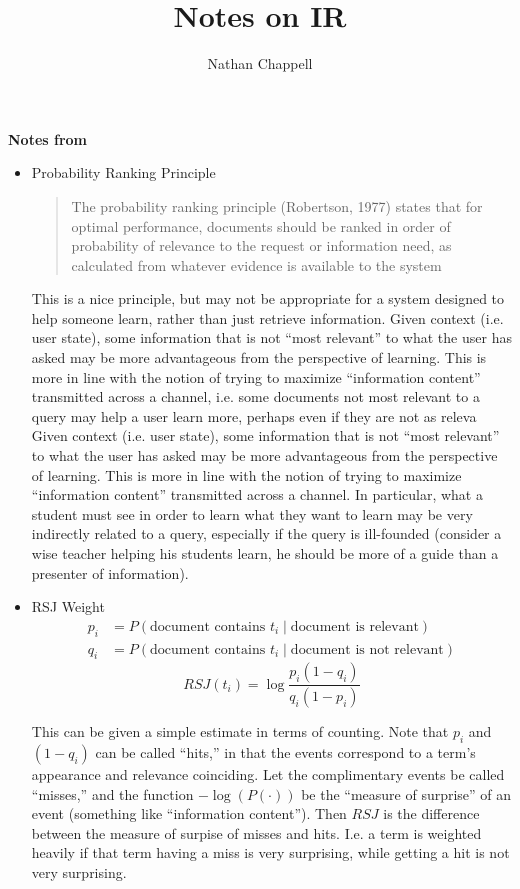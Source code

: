 \documentclass{article}
\title{Notes on IR}
\author{Nathan Chappell}
\newcommand{\hi}[1]{{\large {\bf #1}}}
\begin{document}
\maketitle

\hi{Notes from \cite{robertson04}}

\begin{itemize}
\item Probability Ranking Principle
    \begin{quote}
    The probability ranking principle (Robertson, 1977) states that for optimal performance, documents should be ranked in order of probability of relevance to the request or information need, as calculated from whatever evidence is available to the system
    \end{quote}

    This is a nice principle, but may not be appropriate for a system designed to help someone learn, rather than just retrieve information.  Given context (i.e. user state), some information that is not ``most relevant'' to what the user has asked may be more advantageous from the perspective of learning.  This is more in line with the notion of trying to maximize ``information content'' transmitted across a channel, i.e. some documents not most relevant to a query may help a user learn more, perhaps even if they are not as releva Given context (i.e. user state), some information that is not ``most relevant'' to what the user has asked may be more advantageous from the perspective of learning.  This is more in line with the notion of trying to maximize ``information content'' transmitted across a channel.  In particular, what a student must see in order to learn what they want to learn may be very indirectly related to a query, especially if the query is ill-founded (consider a wise teacher helping his students learn, he should be more of a guide than a presenter of information).

\item RSJ Weight
    \begin{align*}
    p_i & =  P(\text{document contains } t_i \;|\;\text{document is relevant}) \\
    q_i & =  P(\text{document contains } t_i \;|\;\text{document is not relevant})
    \end{align*}
    \[ RSJ(t_i) = \log\frac{p_i(1-q_i)}{q_i(1-p_i)} \]

    This can be given a simple estimate in terms of counting.  Note that $p_i$ and $(1-q_i)$ can be called ``hits,'' in that the events correspond to a term's appearance and relevance coinciding.  Let the complimentary events be called ``misses,'' and the function $-\log(P(\cdot))$ be the ``measure of surprise'' of an event (something like ``information content'').  Then $RSJ$ is the difference between the measure of surpise of misses and hits.  I.e. a term is weighted heavily if that term having a miss is very surprising, while getting a hit is not very surprising.


\end{itemize}
\end{document}
